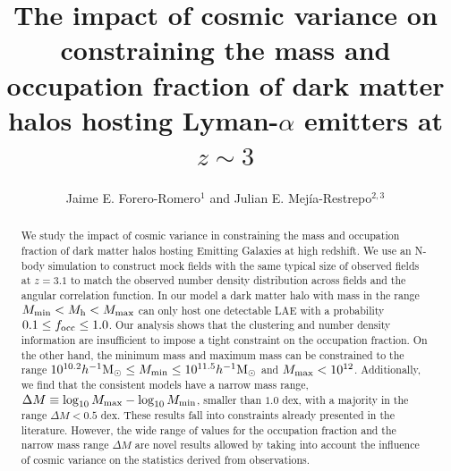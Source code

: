 \documentclass{emulateapj}
\newcommand{\ly}{{\ifmmode{{\rm Ly}\alpha}\else{Ly$\alpha$~}\fi}}
\newcommand{\hMsun}{{\ifmmode{h^{-1}{\rm
        {M_{\odot}}}}\else{$h^{-1}{\rm{M_{\odot}}}$}\fi}}
\begin{document}
\title{The impact of cosmic variance on constraining the mass and
  occupation fraction of dark matter halos hosting Lyman-$\alpha$
  emitters at $z \sim 3$}      
\author{
  Jaime E. Forero-Romero$^{1}$ and
  Julian E. Mej\'ia-Restrepo$^{2,3}$ 
}




\begin{abstract}
%
  We study the impact of cosmic variance in constraining the mass and
  occupation fraction of dark matter halos hosting \ly Emitting
  Galaxies at high redshift. We use an N-body simulation to construct
  mock fields with the same typical size of observed fields at
  $z=3.1$ to match the observed number density distribution across
  fields and the angular correlation function. In our model a dark
  matter halo with mass in the range $M_{\rm min}<M_{\rm h}<M_{\rm
    max}$ can only host one detectable LAE with a probability $0.1
  \leq f_{\rm occ}\leq 1.0$.  Our analysis shows that the clustering
  and number density information are insufficient to impose a tight
  constraint on the occupation fraction. On the other hand, the
  minimum mass and maximum mass can be constrained to the range
$10^{10.2}\hMsun\leq M_{\rm min}\leq 10^{11.5}\hMsun$ and $M_{\rm  max}<10^{12}$\hMsun.
Additionally, we find that the
  consistent models have a narrow mass range, $\Delta M \equiv \log_{10}M_{\rm max} -
  \log_{10} M_{\rm min}$, smaller than $1.0$ dex, with a majority in
  the range $\Delta M<0.5$ dex. These results fall into constraints
  already presented in the literature. However, the wide range of
  values for the occupation fraction and the narrow mass range $\Delta
  M$ are novel results allowed by taking into account the influence of
  cosmic variance on the statistics derived from observations.  
\end{abstract}


\end{document}
